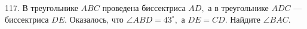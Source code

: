 117. В треугольнике $ABC$ проведена биссектриса $AD,$ а в треугольнике $ADC$ --- биссектриса $DE.$ Оказалось, что $\angle ABD=43^\circ,$ а $DE=CD.$ Найдите $\angle BAC.$\\
